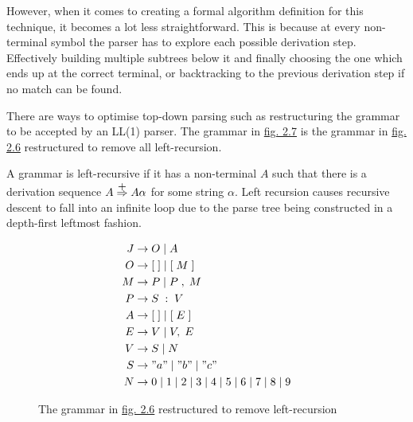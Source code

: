 However, when it comes to creating a formal algorithm definition for this technique, it becomes a lot less straightforward. This is because at every non-terminal symbol the parser has to explore each possible derivation step. Effectively building multiple subtrees below it and finally choosing the one which ends up at the correct terminal, or backtracking to the previous derivation step if no match can be found.

There are ways to optimise top-down parsing such as restructuring the grammar to be accepted by an LL(1) parser. The grammar in \hyperref[fig:2.7]{fig. 2.7} is the grammar in \hyperref[fig:2.6]{fig. 2.6} restructured to remove all left-recursion.

\begin{definition}
    A grammar is left-recursive if it has a non-terminal $A$ such that there is a derivation sequence $A \stackrel{\mathclap{\normalfont\mbox{+}}}{\Rightarrow} A \alpha$ for some string $\alpha$. Left recursion causes recursive descent to fall into an infinite loop due to the parse tree being constructed in a depth-first leftmost fashion.\textsuperscript{\cite{scott_johnstone_1998}}
\end{definition}

\begin{figure}[h]
    \begin{center}
        \begin{equation}
            \begin{split}
                J &\rightarrow O\;|\;A\\
                O &\rightarrow [\;]\;|\;[\;M\;]\\
                M &\rightarrow P\;|\;P\;,\;M\\
                P &\rightarrow S\;:\;V\\
                A &\rightarrow [\;]\;|\;[\;E\;]\\
                E &\rightarrow V\;|\;V,\;E\\
                V &\rightarrow	S\;|\;N\\
                S &\rightarrow	"a"\;|\;"b"\;|\;"c"\\
                N &\rightarrow 0\;|\;1\;|\;2\;|\;3\;|\;4\;|\;5\;|\;6\;|\;7\;|\;8\;|\;9
            \end{split}
            \nonumber
        \end{equation}
    \end{center}
    \vspace{-1em}
    \caption{\label{fig:2.7}The grammar in \hyperref[fig:2.6]{fig. 2.6} restructured to remove left-recursion}
\end{figure}

